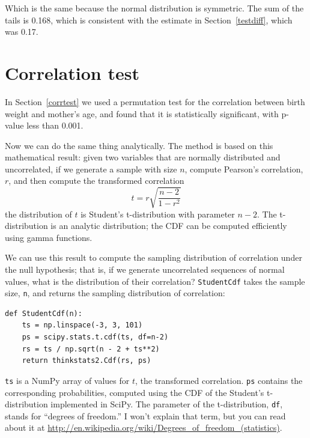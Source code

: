 \documentclass[12pt]{book}
\begin{document}
Which is the same because the normal distribution is symmetric.
The sum of the tails is 0.168, which is consistent with the estimate
in Section~\ref{testdiff}, which was 0.17.



\section{Correlation test}

In Section~\ref{corrtest} we used a permutation test for the correlation
between birth weight and mother's age, and found that it is
statistically significant, with p-value less than 0.001.
   

Now we can do the same thing analytically.  The method is based
on this mathematical result: given two variables that are normally distributed
and uncorrelated, if we generate a sample with size $n$,
compute Pearson's correlation, $r$, and then compute the transformed
correlation
%
\[ t = r \sqrt{\frac{n-2}{1-r^2}} \]
%
the distribution of $t$ is Student's t-distribution with parameter
$n-2$.  The t-distribution is an analytic distribution; the CDF can
be computed efficiently using gamma functions.

We can use this result to compute the sampling distribution of
correlation under the null hypothesis; that is, if we generate
uncorrelated sequences of normal values, what is the distribution of
their correlation?  {\tt StudentCdf} takes the sample size, {\tt n}, and
returns the sampling distribution of correlation:

\begin{verbatim}
def StudentCdf(n):
    ts = np.linspace(-3, 3, 101)
    ps = scipy.stats.t.cdf(ts, df=n-2)
    rs = ts / np.sqrt(n - 2 + ts**2)
    return thinkstats2.Cdf(rs, ps)
\end{verbatim}

{\tt ts} is a NumPy array of values for $t$, the transformed
correlation.  {\tt ps} contains the corresponding probabilities,
computed using the CDF of the Student's t-distribution implemented in
SciPy.  The parameter of the t-distribution, {\tt df}, stands for
``degrees of freedom.''  I won't explain that term, but you can read
about it at
\url{http://en.wikipedia.org/wiki/Degrees_of_freedom_(statistics)}.
\end{document}
